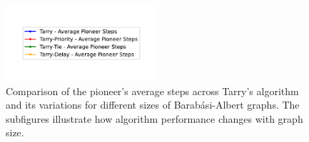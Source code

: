 \begin{figure}[H]
    \centering
    \qquad
    \qquad
    \includegraphics[width=0.5\textwidth]{Cap3/tarry_var_steps_legend.pdf}
    \newline
    \qquad
    \newline
    \qquad
    \caption{Comparison of the pioneer's average steps across Tarry's algorithm and its variations for different sizes of Barabási-Albert graphs. The subfigures illustrate how algorithm performance changes with graph size.} 
    \label{fig_tarry_steps_all_sizes_barabasi} 
\end{figure}


